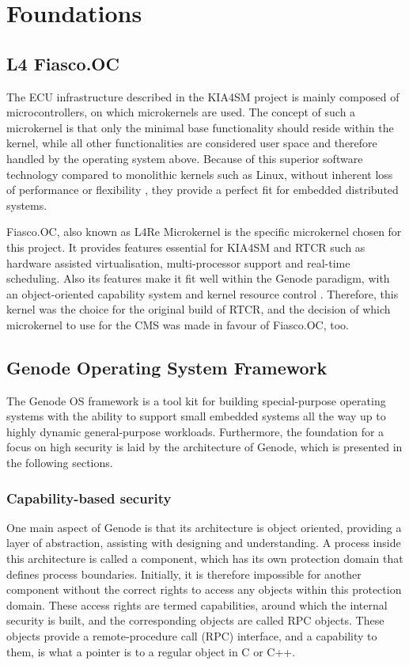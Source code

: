 
\chapter{Foundations}\label{chapter:foundations}

\section{L4 Fiasco.OC}
The ECU infrastructure described in the KIA4SM project is mainly composed of microcontrollers, on which microkernels are used. The concept of such a microkernel is that only the minimal base functionality should reside within the kernel, while all other functionalities are considered user space and therefore handled by the operating system above. Because of this superior software technology compared to monolithic kernels such as Linux, without inherent loss of performance or flexibility \cite{micro}, they provide a perfect fit for embedded distributed systems.

Fiasco.OC, also known as L4Re Microkernel is the specific microkernel chosen for this project. It provides features essential for KIA4SM and RTCR such as hardware assisted virtualisation, multi-processor support and real-time scheduling. Also its features make it fit well within the Genode paradigm, with an object-oriented capability system and kernel resource control \cite{fiasco}. Therefore, this kernel was the choice for the original build of RTCR, and the decision of which microkernel to use for the CMS was made in favour of Fiasco.OC, too.

\section{Genode Operating System Framework}
The Genode OS framework is a tool kit for building special-purpose operating systems with the ability to support small embedded systems all the way up to highly dynamic general-purpose workloads. Furthermore, the foundation for a focus on high security is laid by the architecture of Genode, which is presented in the following sections. \cite[P.14]{genode_foundations}
\subsection{Capability-based security}
One main aspect of Genode is that its architecture is object oriented, providing a layer of abstraction, assisting with designing and understanding. A process inside this architecture is called a component, which has its own protection domain that defines process boundaries. Initially, it is therefore impossible for another component without the correct rights to access any objects within this protection domain. These access rights are termed capabilities, around which the internal security is built, and the corresponding objects are called RPC objects. These objects provide a remote-procedure call (RPC) interface, and a capability to them, is what a pointer is to a regular object in C or C++.

